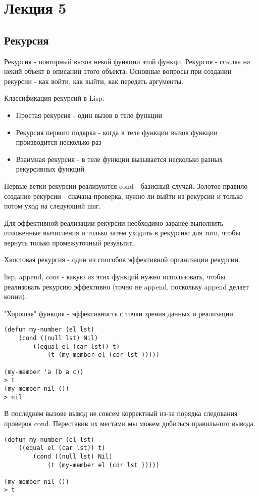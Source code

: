 \chapter{Лекция 5}
\section{Рекурсия}
Рекурсия - повторный вызов некой функции этой функци. Рекурсия - ссылка на некий объект в описании этого объекта. Основные вопросы при создании рекурсии - как войти, как выйти, как передать аргументы.

Классификация рекурсий в Lisp:
\begin{itemize}
\item Простая рекурсия - один вызов в теле функции
\item Рекурсия первого подярка - когда в теле функции вызов функции производится несколько раз
\item Взаимная рекурсия - в теле функции вызывается несколько разных рекурсивных функций
\end{itemize}

Первые ветки рекурсии реализуются cond - базисный случай. Золотое правило создание рекурсии - сначана проверка, нужно ли выйти из рекурсии и только потом уход на следующий шаг.

Для эффективной реализации рекурсии необходимо заранее выполнить отложенные вычисления и только затем уходить в рекурсию для того, чтобы вернуть только промежуточный результат. 

Хвостовая рекурсия - один из способов эффективной организации рекурсии.

lisp, append, cons - какую из этих функций нужно использовать, чтобы реализовать рекурсию эффективно (точно не append, поскольку append делает копии).

"Хорошая" функция - эффективность с точки зрения данных и реализации.

\begin{lstlisting}
(defun my-number (el lst)
	(cond ((null lst) Nil)
		((equal el (car lst)) t)
			(t (my-member el (cdr lst )))))

(my-member 'a (b a c))
> t
(my-member nil ())
> nil
\end{lstlisting}
В последнем вызове вывод не совсем корректный из-за порядка следования проверок cond. Переставив их местами мы можем добиться правильного вывода.

\begin{lstlisting}
(defun my-number (el lst)
	((equal el (car lst)) t)
		(cond ((null lst) Nil)
			(t (my-member el (cdr lst )))))

(my-member nil ())
> t
\end{lstlisting}

